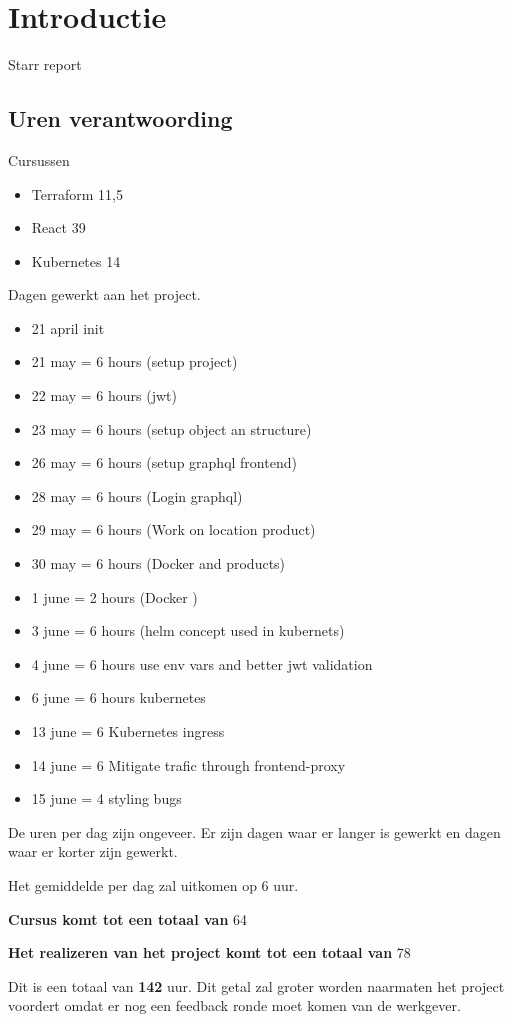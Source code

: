 \section{Introductie}
Starr report

\subsection{Uren verantwoording}

Cursussen
\begin{itemize}
	\item Terraform 11,5
	\item React 39
	\item Kubernetes 14
\end{itemize}

Dagen gewerkt aan het project.

\begin{itemize}
	\item 21 april init
	\item 21 may = 6 hours (setup project)
	\item 22 may = 6 hours (jwt)
	\item 23 may = 6 hours (setup object an structure)
	\item 26 may = 6 hours (setup graphql frontend)
	\item 28 may = 6 hours (Login graphql)
	\item 29 may = 6 hours (Work on location product)
	\item 30 may = 6 hours (Docker and products)
	\item 1 june = 2 hours (Docker )
	\item 3 june = 6 hours (helm concept used in kubernets)
	\item 4 june = 6 hours use env vars and better jwt validation
	\item 6 june = 6 hours kubernetes
	\item 13 june = 6 Kubernetes ingress
	\item 14 june = 6 Mitigate trafic through frontend-proxy
	\item 15 june = 4 styling bugs
\end{itemize}


De uren per dag zijn ongeveer.
Er zijn dagen waar er langer is gewerkt en dagen waar er korter zijn gewerkt.

Het gemiddelde per dag zal uitkomen op 6 uur.


\textbf{Cursus komt tot een totaal van}  64

\textbf{Het realizeren van het project komt tot een totaal van} 78


Dit is een totaal van \textbf{142} uur.
Dit getal zal groter worden naarmaten het project voordert omdat er nog een feedback ronde moet komen van de werkgever.


